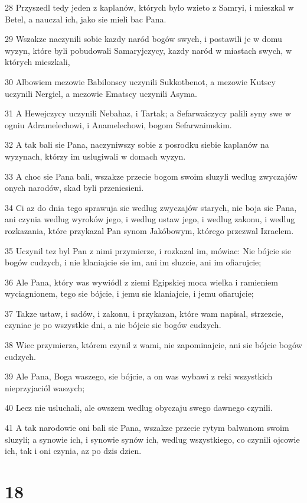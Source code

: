 \par 28 Przyszedl tedy jeden z kaplanów, których bylo wzieto z Samryi, i mieszkal w Betel, a nauczal ich, jako sie mieli bac Pana.
\par 29 Wszakze naczynili sobie kazdy naród bogów swych, i postawili je w domu wyzyn, które byli pobudowali Samaryjczycy, kazdy naród w miastach swych, w których mieszkali,
\par 30 Albowiem mezowie Babilonscy uczynili Sukkotbenot, a mezowie Kutscy uczynili Nergiel, a mezowie Ematscy uczynili Asyma.
\par 31 A Hewejczycy uczynili Nebahaz, i Tartak; a Sefarwaiczycy palili syny swe w ogniu Adramelechowi, i Anamelechowi, bogom Sefarwaimskim.
\par 32 A tak bali sie Pana, naczyniwszy sobie z posrodku siebie kaplanów na wyzynach, którzy im uslugiwali w domach wyzyn.
\par 33 A choc sie Pana bali, wszakze przecie bogom swoim sluzyli wedlug zwyczajów onych narodów, skad byli przeniesieni.
\par 34 Ci az do dnia tego sprawuja sie wedlug zwyczajów starych, nie boja sie Pana, ani czynia wedlug wyroków jego, i wedlug ustaw jego, i wedlug zakonu, i wedlug rozkazania, które przykazal Pan synom Jakóbowym, którego przezwal Izraelem.
\par 35 Uczynil tez byl Pan z nimi przymierze, i rozkazal im, mówiac: Nie bójcie sie bogów cudzych, i nie klaniajcie sie im, ani im sluzcie, ani im ofiarujcie;
\par 36 Ale Pana, który was wywiódl z ziemi Egipskiej moca wielka i ramieniem wyciagnionem, tego sie bójcie, i jemu sie klaniajcie, i jemu ofiarujcie;
\par 37 Takze ustaw, i sadów, i zakonu, i przykazan, które wam napisal, strzezcie, czyniac je po wszystkie dni, a nie bójcie sie bogów cudzych.
\par 38 Wiec przymierza, którem czynil z wami, nie zapominajcie, ani sie bójcie bogów cudzych.
\par 39 Ale Pana, Boga waszego, sie bójcie, a on was wybawi z reki wszystkich nieprzyjaciól waszych;
\par 40 Lecz nie usluchali, ale owszem wedlug obyczaju swego dawnego czynili.
\par 41 A tak narodowie oni bali sie Pana, wszakze przecie rytym balwanom swoim sluzyli; a synowie ich, i synowie synów ich, wedlug wszystkiego, co czynili ojcowie ich, tak i oni czynia, az po dzis dzien.

\chapter{18}

